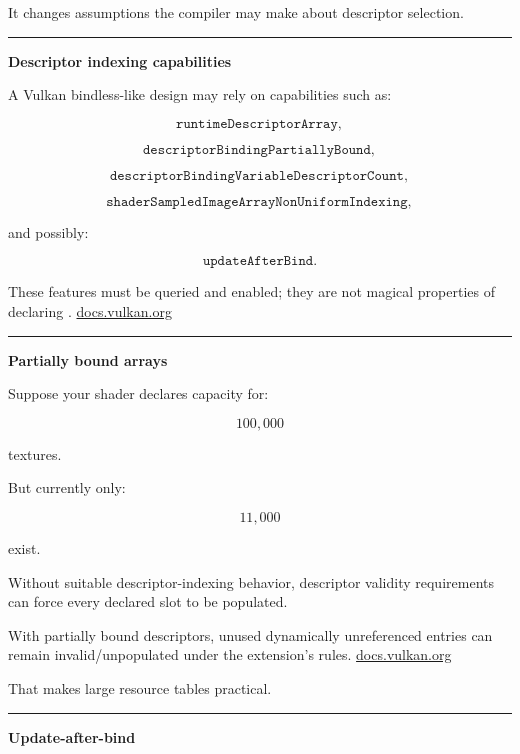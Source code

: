 It changes assumptions the compiler may make about descriptor selection.

\begin{center}\rule{0.5\linewidth}{0.5pt}\end{center}

\textbf{Descriptor indexing capabilities}

A Vulkan bindless-like design may rely on capabilities such as:

\[
\texttt{runtimeDescriptorArray},
\]

\[
\texttt{descriptorBindingPartiallyBound},
\]

\[
\texttt{descriptorBindingVariableDescriptorCount},
\]

\[
\texttt{shaderSampledImageArrayNonUniformIndexing},
\]

and possibly:

\[
\texttt{updateAfterBind}.
\]

These features must be queried and enabled; they are not magical properties of declaring . \href{https://docs.vulkan.org/guide/latest/extensions/VK_EXT_descriptor_indexing.html?utm_source=chatgpt.com}{docs.vulkan.org}

\begin{center}\rule{0.5\linewidth}{0.5pt}\end{center}

\textbf{Partially bound arrays}

Suppose your shader declares capacity for:

\[
100,000
\]

textures.

But currently only:

\[
11,000
\]

exist.

Without suitable descriptor-indexing behavior, descriptor validity requirements can force every declared slot to be populated.

With partially bound descriptors, unused dynamically unreferenced entries can remain invalid/unpopulated under the extension's rules. \href{https://docs.vulkan.org/spec/latest/chapters/descriptorsets.html?utm_source=chatgpt.com}{docs.vulkan.org}

That makes large resource tables practical.

\begin{center}\rule{0.5\linewidth}{0.5pt}\end{center}

\textbf{Update-after-bind}

